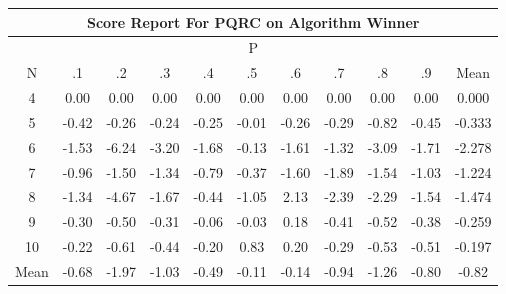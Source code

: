 \documentclass[11pt,a4paper]{report}
\begin{document}
\begin{longtable}{ | c || c | c | c | c | c | c | c | c | c || c |}
\hline
\multicolumn{11}{|c|}{ Score Report For PQRC on Algorithm Winner} \\
\hline
\multicolumn{11}{|c|}{ P } \\
\hline
N & .1 & .2 & .3 & .4 & .5 & .6 & .7 & .8 & .9 & Mean\\
 \hline
 \hline
 \endhead
  4 &  \cellcolor[HTML]{FFFFFF} 0.00 &  \cellcolor[HTML]{FFFFFF} 0.00 &  \cellcolor[HTML]{FFFFFF} 0.00 &  \cellcolor[HTML]{FFFFFF} 0.00 &  \cellcolor[HTML]{FFFFFF} 0.00 &  \cellcolor[HTML]{FFFFFF} 0.00 &  \cellcolor[HTML]{FFFFFF} 0.00 &  \cellcolor[HTML]{FFFFFF} 0.00 &  \cellcolor[HTML]{FFFFFF} 0.00 & 0.000 \\
  5 &  \cellcolor[HTML]{FFF7F7} -0.42 &  \cellcolor[HTML]{FFF7F7} -0.26 &  \cellcolor[HTML]{FFF7F7} -0.24 &  \cellcolor[HTML]{FFF7F7} -0.25 &  \cellcolor[HTML]{FFFFFF} -0.01 &  \cellcolor[HTML]{FFF7F7} -0.26 &  \cellcolor[HTML]{FFF7F7} -0.29 &  \cellcolor[HTML]{FFE7E7} -0.82 &  \cellcolor[HTML]{FFF7F7} -0.45 & -0.333 \\
  6 &  \cellcolor[HTML]{FFD7D7} -1.53 &  \cellcolor[HTML]{FF6060} -6.24 &  \cellcolor[HTML]{FFAFAF} -3.20 &  \cellcolor[HTML]{FFD7D7} -1.68 &  \cellcolor[HTML]{FFFFFF} -0.13 &  \cellcolor[HTML]{FFD7D7} -1.61 &  \cellcolor[HTML]{FFDFDF} -1.32 &  \cellcolor[HTML]{FFAFAF} -3.09 &  \cellcolor[HTML]{FFD7D7} -1.71 & -2.278 \\
  7 &  \cellcolor[HTML]{FFE7E7} -0.96 &  \cellcolor[HTML]{FFD7D7} -1.50 &  \cellcolor[HTML]{FFDFDF} -1.34 &  \cellcolor[HTML]{FFEFEF} -0.79 &  \cellcolor[HTML]{FFF7F7} -0.37 &  \cellcolor[HTML]{FFD7D7} -1.60 &  \cellcolor[HTML]{FFCFCF} -1.89 &  \cellcolor[HTML]{FFD7D7} -1.54 &  \cellcolor[HTML]{FFE7E7} -1.03 & -1.224 \\
  8 &  \cellcolor[HTML]{FFDFDF} -1.34 &  \cellcolor[HTML]{FF8787} -4.67 &  \cellcolor[HTML]{FFD7D7} -1.67 &  \cellcolor[HTML]{FFF7F7} -0.44 &  \cellcolor[HTML]{FFE7E7} -1.05 &  \cellcolor[HTML]{C7C7FF} 2.13 &  \cellcolor[HTML]{FFBFBF} -2.39 &  \cellcolor[HTML]{FFC7C7} -2.29 &  \cellcolor[HTML]{FFD7D7} -1.54 & -1.474 \\
  9 &  \cellcolor[HTML]{FFF7F7} -0.30 &  \cellcolor[HTML]{FFEFEF} -0.50 &  \cellcolor[HTML]{FFF7F7} -0.31 &  \cellcolor[HTML]{FFFFFF} -0.06 &  \cellcolor[HTML]{FFFFFF} -0.03 &  \cellcolor[HTML]{F7F7FF} 0.18 &  \cellcolor[HTML]{FFF7F7} -0.41 &  \cellcolor[HTML]{FFEFEF} -0.52 &  \cellcolor[HTML]{FFF7F7} -0.38 & -0.259 \\
  10 &  \cellcolor[HTML]{FFF7F7} -0.22 &  \cellcolor[HTML]{FFEFEF} -0.61 &  \cellcolor[HTML]{FFF7F7} -0.44 &  \cellcolor[HTML]{FFF7F7} -0.20 &  \cellcolor[HTML]{E7E7FF} 0.83 &  \cellcolor[HTML]{F7F7FF} 0.20 &  \cellcolor[HTML]{FFF7F7} -0.29 &  \cellcolor[HTML]{FFEFEF} -0.53 &  \cellcolor[HTML]{FFEFEF} -0.51 & -0.197 \\
 \hline
 \hline
Mean &  \cellcolor[HTML]{FFEFEF} -0.68 &  \cellcolor[HTML]{FFCFCF} -1.97 &  \cellcolor[HTML]{FFE7E7} -1.03 &  \cellcolor[HTML]{FFEFEF} -0.49 &  \cellcolor[HTML]{FFFFFF} -0.11 &  \cellcolor[HTML]{FFFFFF} -0.14 &  \cellcolor[HTML]{FFE7E7} -0.94 &  \cellcolor[HTML]{FFDFDF} -1.26 &  \cellcolor[HTML]{FFE7E7} -0.80 &  \cellcolor[HTML]{FFE7E7} -0.82
\end{longtable}
\end{document}
